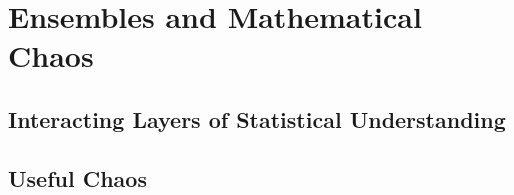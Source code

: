 \setchapterpreamble[u]{\margintoc}
\chapter{Ensembles and Mathematical Chaos}

\section{Interacting Layers of Statistical Understanding}
\section{Useful Chaos}

